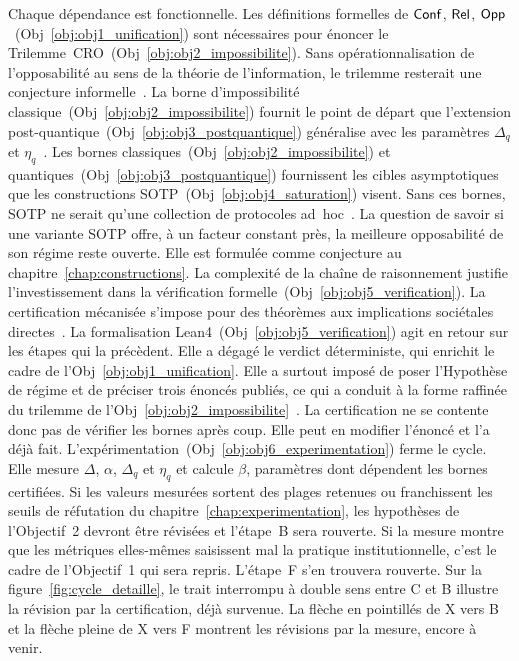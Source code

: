 \begin{sloppypar}
Chaque d\'ependance est fonctionnelle. Les d\'efinitions formelles de
$\mathsf{Conf}$, $\mathsf{Rel}$, $\mathsf{Opp}$~(Obj~\ref{obj:obj1_unification}) sont n\'ecessaires pour \'enoncer
le Trilemme~CRO~(Obj~\ref{obj:obj2_impossibilite}). Sans op\'erationnalisation
de l'opposabilit\'e au sens de la th\'eorie de l'information, le trilemme resterait une
conjecture informelle~\cite{ClarksonSchneider10}. La borne d'impossibilit\'e classique~(Obj~\ref{obj:obj2_impossibilite}) fournit
le point de d\'epart que l'extension post-quantique~(Obj~\ref{obj:obj3_postquantique}) g\'en\'eralise avec
les param\`etres $\Delta_q$ et $\eta_q$~\cite{NielsenChuang2010,Wilde2017}. Les bornes classiques~(Obj~\ref{obj:obj2_impossibilite})
et quantiques~(Obj~\ref{obj:obj3_postquantique}) fournissent les cibles asymptotiques que les
constructions SOTP~(Obj~\ref{obj:obj4_saturation}) visent. Sans ces bornes, SOTP ne serait qu'une
collection de protocoles ad~hoc~\cite{JohnsonLindenstrauss84,Groth16}. La
question de savoir si une variante SOTP offre, \`a un facteur constant pr\`es, la meilleure
opposabilit\'e de son r\'egime reste ouverte. Elle est formul\'ee comme conjecture au chapitre~\ref{chap:constructions}. La complexit\'e de la cha\^ine de
raisonnement justifie l'investissement dans la v\'erification formelle~(Obj~\ref{obj:obj5_verification}).
La certification m\'ecanis\'ee s'impose pour des th\'eor\`emes aux implications
soci\'etales directes~\cite{Gonthier08,Wiedijk2007}. La formalisation Lean4~(Obj~\ref{obj:obj5_verification}) agit en retour sur les \'etapes
qui la pr\'ec\`edent. Elle a d\'egag\'e le verdict d\'eterministe, qui enrichit le cadre de
l'Obj~\ref{obj:obj1_unification}. Elle a surtout impos\'e de poser l'Hypoth\`ese de r\'egime
et de pr\'eciser trois \'enonc\'es publi\'es, ce qui a conduit \`a la forme raffin\'ee du trilemme
de l'Obj~\ref{obj:obj2_impossibilite}~\cite{Zellagui2018}. La certification ne se contente donc pas
de v\'erifier les bornes apr\`es coup. Elle peut en modifier l'\'enonc\'e et l'a d\'ej\`a fait.
L'exp\'erimentation~(Obj~\ref{obj:obj6_experimentation}) ferme le cycle. Elle mesure $\Delta$, $\alpha$,
$\Delta_q$ et $\eta_q$ et calcule $\beta$, param\`etres dont d\'ependent les bornes certifi\'ees. Si les valeurs mesur\'ees
sortent des plages retenues ou franchissent les seuils de r\'efutation du
chapitre~\ref{chap:experimentation}, les hypoth\`eses de l'Objectif~2 devront \^etre r\'evis\'ees et
l'\'etape~B sera rouverte. Si la mesure montre que les m\'etriques elles-m\^emes saisissent mal
la pratique institutionnelle, c'est le cadre de l'Objectif~1 qui sera repris. L'\'etape~F s'en trouvera
rouverte. Sur la figure~\ref{fig:cycle_detaille}, le trait interrompu \`a double sens entre C et B
illustre la r\'evision par la certification, d\'ej\`a survenue. La fl\`eche en pointill\'es de X vers B
et la fl\`eche pleine de X vers F montrent les r\'evisions par la mesure, encore \`a venir.


\end{sloppypar}
